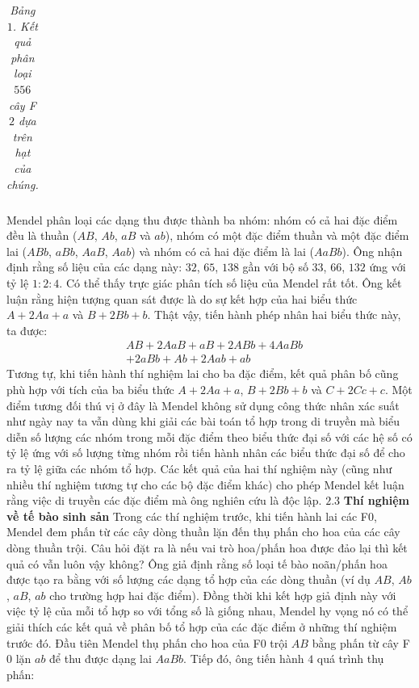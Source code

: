 \begin{multicols}{2}
\begin{table}[H]
{\begin{tabular}{|l|p{1.6cm}|p{2cm}|p{1.6cm}|}
				\hline
		\end{tabular}}
		\caption{\small\textit{\color{timhieukhoahoc}Bảng $1$. Kết quả phân loại $556$ cây F$2$ dựa trên hạt của chúng.}}
		\vspace*{-10pt}
	\end{table}
	Mendel phân loại các dạng thu được thành ba nhóm: nhóm có cả hai đặc điểm đều là thuần ($AB$, $Ab$, $aB$ và $ab$), nhóm có một đặc điểm thuần và một đặc điểm lai ($ABb$, $aBb$, $AaB$, $Aab$) và nhóm có cả hai đặc điểm là lai ($AaBb$). Ông nhận định rằng số liệu của các dạng này: $32$, $65$, $138$ gần với bộ số $33$, $66$, $132$ ứng với tỷ lệ $1 : 2 : 4$. Có thể thấy trực giác phân tích số liệu của Mendel rất tốt. Ông kết luận rằng hiện tượng quan sát được là do sự kết hợp của hai biểu thức $A + 2Aa + a$ và $B + 2Bb +b$. Thật vậy, tiến hành phép nhân hai biểu thức này, ta được:
	\begin{align*}
		&AB + 2AaB + aB + 2ABb +4AaBb\\
		&+ 2aBb + Ab + 2Aab + ab
	\end{align*}
	Tương tự, khi tiến hành thí nghiệm lai cho ba đặc điểm, kết quả phân bố cũng phù hợp với tích của ba biểu thức $A + 2Aa + a$, $B + 2Bb +b$ và $C + 2Cc + c$.
	\vskip 0.1cm
	Một điểm tương đối thú vị ở đây là Mendel không sử dụng công thức nhân xác suất như ngày nay ta vẫn dùng khi giải các bài toán tổ hợp trong di truyền mà biểu diễn số lượng các nhóm trong mỗi đặc điểm theo biểu thức đại số với các hệ số có tỷ lệ ứng với số lượng từng nhóm rồi tiến hành nhân các biểu thức đại số để cho ra tỷ lệ giữa các nhóm tổ hợp.
	\vskip 0.1cm
	Các kết quả của hai thí nghiệm này (cũng như nhiều thí nghiệm tương tự cho các bộ đặc điểm khác) cho phép Mendel kết luận rằng việc di truyền các đặc điểm mà ông nghiên cứu là độc lập.
	\vskip 0.1cm
	$\pmb{2.3}$ \textbf{\color{timhieukhoahoc}Thí nghiệm về tế bào sinh sản}
	\vskip 0.1cm
	Trong các thí nghiệm trước, khi tiến hành lai các F$0$, Mendel đem phấn từ các cây dòng thuần lặn đến thụ phấn cho hoa của các cây dòng thuần trội. Câu hỏi đặt ra là nếu vai trò hoa/phấn hoa được đảo lại thì kết quả có vẫn luôn vậy không? Ông giả định rằng số loại tế bào noãn/phấn hoa được tạo ra bằng với số lượng các dạng tổ hợp của các dòng thuần (ví dụ $AB$, $Ab$, $aB$, $ab$ cho trường hợp hai đặc điểm). Đồng thời khi kết hợp giả định này với việc tỷ lệ của mỗi tổ hợp so với tổng số là giống nhau, Mendel hy vọng nó có thể giải thích các kết quả về phân bố tổ hợp của các đặc điểm ở những thí nghiệm trước đó.
	\vskip 0.1cm
	Đầu tiên Mendel thụ phấn cho hoa của F$0$ trội $AB$ bằng phấn từ cây F$0$ lặn $ab$ để thu được dạng lai $AaBb$. Tiếp đó, ông tiến hành $4$ quá trình thụ phấn:

\end{multicols}
